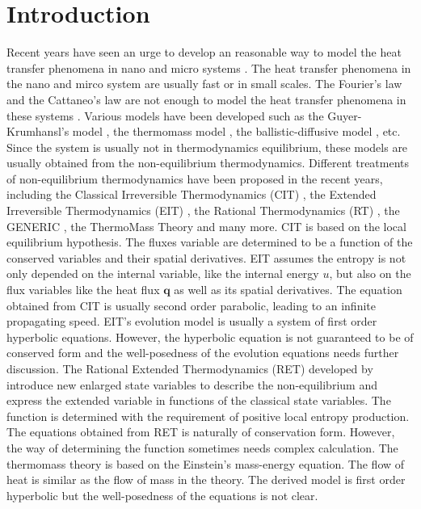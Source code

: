 \documentclass[a4paper]{article}
\begin{document}
\section{Introduction}
Recent years have seen an urge to develop an reasonable way to model the heat transfer phenomena in nano and micro systems \cite{chen2005nanoscale,tzou1996macro,wang2007heat,ding2006heat}. The heat transfer phenomena in the nano and mirco system are usually fast or in small scales. The Fourier's law and the Cattaneo's law are not enough to model the heat transfer phenomena in these systems \cite{chen2005nanoscale,Jou1996extended}. Various models have been developed such as the Guyer-Krumhansl's model \cite{guyer1966solution}, the thermomass model \cite{tzou2010nonlocal}, the ballistic-diffusive model \cite{chen2001ballistic,chen2002ballistic}, etc. Since the system is usually not in thermodynamics equilibrium, these models are usually obtained from the non-equilibrium thermodynamics. Different treatments of non-equilibrium thermodynamics have been proposed in the recent years, including the Classical Irreversible Thermodynamics (CIT) \cite{lebon2008classical}, the Extended Irreversible Thermodynamics (EIT) \cite{Jou1996extended}, the Rational Thermodynamics (RT) \cite{muller1998rational}, the GENERIC \cite{hans2005beyond}, the ThermoMass Theory \cite{zeng2006motion,dong2011generalized} and many more. CIT is based on the local equilibrium hypothesis. The fluxes variable are determined to be a function of the conserved variables and their spatial derivatives. EIT assumes the entropy is not only depended on the internal variable, like the internal energy $u$, but also on the flux variables like the heat flux $\mathbf{q}$ as well as its spatial derivatives. The equation obtained from CIT is usually second order parabolic, leading to an infinite propagating speed. EIT's evolution model is usually a system of first order hyperbolic equations. However, the hyperbolic equation is not guaranteed to be of conserved form and the well-posedness of the evolution equations needs further discussion\cite{Jou1996extended}. The Rational Extended Thermodynamics (RET) developed by \cite{liu2002rational,muller1998formal,Jou1996extended} introduce new enlarged state variables to describe the non-equilibrium and express the extended variable in functions of the classical state variables. The function is determined with the requirement of positive local entropy production. The equations obtained from RET is naturally of conservation form. However, the way of determining the function sometimes needs complex calculation. The thermomass theory is based on the Einstein's mass-energy equation. The flow of heat is similar as the flow of mass in the theory. The derived model is first order hyperbolic but the well-posedness of the equations is not clear.%
\end{document}
